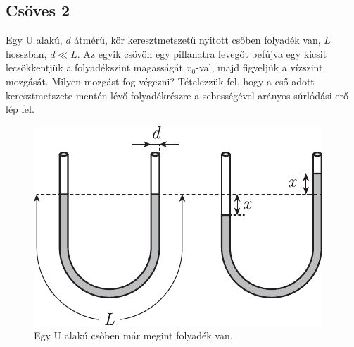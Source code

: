 \documentclass[12pt,a4paper]{scrartcl}
\begin{document}
\subsection{Csöves 2}
Egy U alakú, $d$ átmérű, kör keresztmetszetű nyitott csőben folyadék van, $L$ hosszban, $d \ll L$. Az egyik csövön egy pillanatra levegőt befújva egy kicsit lecsökkentjük a folyadékszint magasságát $x_0$-val, majd figyeljük a vízszint mozgását. Milyen mozgást fog végezni? Tételezzük fel, hogy a cső adott keresztmetszete mentén lévő folyadékrészre a sebességével arányos súrlódási erő lép fel.
\begin{figure}[htb] 
\centering    
\includegraphics[scale=1]{figs/ucsoves2.pdf}
\caption{Egy U alakú csőben már megint folyadék van.}
\label{fig:ucsoves2}
\end{figure}
\FloatBarrier

\fi
\end{document}
